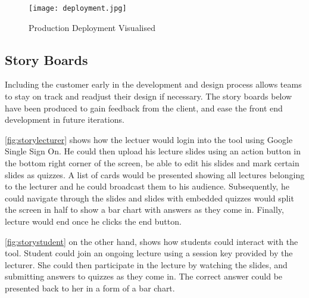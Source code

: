 \begin{figure}[h!]
    \centering
    \texttt{[image: deployment.jpg]}
    \caption{Production Deployment Visualised}
    \label{fig:deploymentprocess}
\end{figure}

\subsection{Story Boards}
Including the customer
early in the development and design process allows teams to stay on track and readjust
their design if necessary. The story boards below have been produced to gain feedback
from the client, and ease the front end development in future iterations.

\autoref{fig:storylecturer} shows how the lectuer would login into the tool using
Google Single Sign On. He could then upload his lecture slides using an action
button in the bottom right corner of the screen, be able to edit his slides and
mark certain slides as quizzes. A list of cards would be presented showing all
lectures belonging to the lecturer and he could broadcast them to his audience.
Subsequently, he could navigate through the slides and slides with embedded quizzes would
split the screen in half to show a bar chart with answers as they come in. Finally,
lecture would end once he clicks the end button.

\autoref{fig:storystudent} on the other hand, shows how students could interact with
the tool. Student could join an ongoing lecture using a session key provided by the
lecturer. She could then participate in the lecture by watching the slides, and
submitting answers to quizzes as they come in. The correct answer could be presented
back to her in a form of a bar chart.

